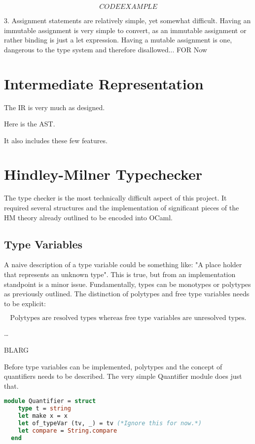 \documentclass{l4proj}
\begin{document}
\[CODE EXAMPLE\]

3. Assignment statements are relatively simple, yet somewhat difficult.
Having an immutable assignment is very simple to convert, as an immutable assignment or rather binding is just a let expression.
Having a mutable assignment is one, dangerous to the type system and therefore disallowed... FOR Now


\section{Intermediate Representation}

The IR is very much as designed.

Here is the AST.

It also includes these few features.

\section{Hindley-Milner Typechecker}

The type checker is the most technically difficult aspect of this project.
It required several structures and the implementation of significant pieces of the HM theory already outlined to be encoded into OCaml.

\subsection{Type Variables}

A naive description of a type variable could be something like: "A place holder that represents an unknown type".
This is true, but from an implementation standpoint is a minor issue.
Fundamentally, types can be monotypes or polytypes as previously outlined.
The distinction of polytypes and free type variables needs to be explicit:

\[\text{Polytypes are resolved types whereas free type variables are unresolved types.}\]

\dots

BLARG



Before type variables can be implemented, polytypes and the concept of quantifiers needs to be described.
The very simple Quantifier module does just that.

\begin{lstlisting}[language=Caml]
  module Quantifier = struct
    type t = string
    let make x = x
    let of_typeVar (tv, _) = tv (*Ignore this for now.*)
    let compare = String.compare
  end
\end{lstlisting}
\end{document}

